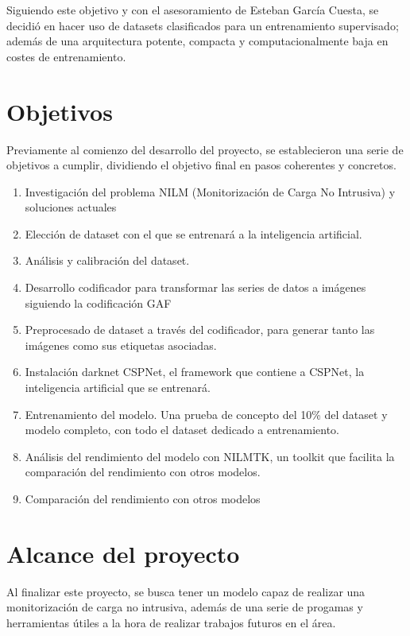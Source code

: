 Siguiendo este objetivo y con el asesoramiento de Esteban García Cuesta, se decidió en hacer uso de datasets clasificados para un entrenamiento supervisado; además de una arquitectura potente, compacta y computacionalmente baja en costes de entrenamiento. 

\section{Objetivos}
\label{sec:objetivos}
Previamente al comienzo del desarrollo del proyecto, se establecieron una serie de objetivos a cumplir, dividiendo el objetivo final en pasos coherentes y concretos.
\begin{enumerate}
	\item Investigación del problema NILM (Monitorización de Carga No Intrusiva) y soluciones actuales
	\item Elección de dataset con el que se entrenará a la inteligencia artificial.
	\item Análisis y calibración del dataset.
	\item Desarrollo codificador para transformar las series de datos a imágenes siguiendo la codificación GAF
	\item Preprocesado de dataset a través del codificador, para generar tanto las imágenes como sus etiquetas asociadas. 
	\item Instalación darknet CSPNet, el framework que contiene a CSPNet, la inteligencia artificial que se entrenará.
	\item Entrenamiento del modelo. Una prueba de concepto del 10\% del dataset y modelo completo, con todo el dataset dedicado a entrenamiento.
	\item Análisis del rendimiento del modelo con NILMTK, un toolkit que facilita la comparación del rendimiento con otros modelos. 
	\item Comparación del rendimiento con otros modelos
\end{enumerate}

\section{Alcance del proyecto}
\label{sec:alcanceproyecto}
Al finalizar este proyecto, se busca tener un modelo capaz de realizar una monitorización de carga no intrusiva, además de una serie de progamas y herramientas útiles a la hora de realizar trabajos futuros en el área.


